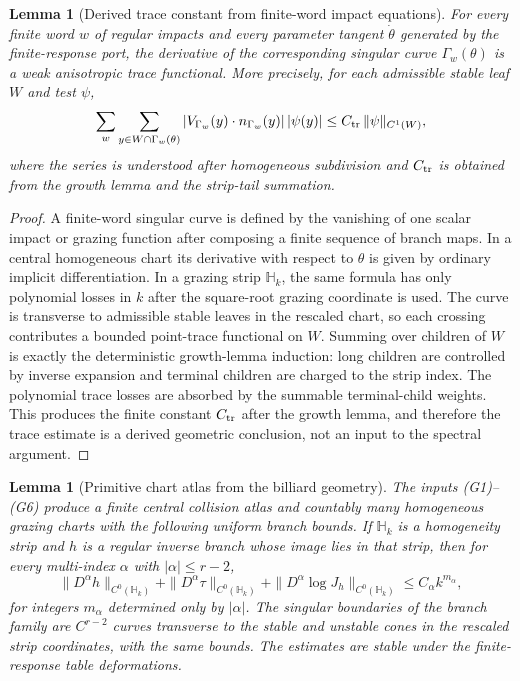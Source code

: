 \documentclass[12pt, letterpaper]{amsart}
\theoremstyle{plain}
\newtheorem{lemma}[theorem]{Lemma}
\theoremstyle{definition}
\theoremstyle{remark}
\begin{document}
\begin{lemma}[Derived trace constant from finite-word impact equations]
\label{lem:finite_word_trace_bound_strengthened}
For every finite word $w$ of regular impacts and every parameter tangent
$\dot\theta$ generated by the finite-response port, the derivative of the
corresponding singular curve $\Gamma_w(\theta)$ is a weak anisotropic trace
functional.  More precisely, for each admissible stable leaf $W$ and test
$\psi$,
\begin{equation}
\label{eq:derived_trace_constant_bound}
    \sum_{w}\sum_{y\in W\cap\Gamma_w(\theta)}
       |V_{\Gamma_w}(y)\cdot n_{\Gamma_w}(y)|\,|\psi(y)|
       \le C_{\rm tr}\,\|\psi\|_{C^1(W)},
\end{equation}
where the series is understood after homogeneous subdivision and
$C_{\rm tr}$ is obtained from the growth lemma and the strip-tail summation.
\end{lemma}

\begin{proof}
A finite-word singular curve is defined by the vanishing of one scalar impact
or grazing function after composing a finite sequence of branch maps.  In a
central homogeneous chart its derivative with respect to $\theta$ is given by
ordinary implicit differentiation.  In a grazing strip $\mathbb H_k$, the same
formula has only polynomial losses in $k$ after the square-root grazing
coordinate is used.  The curve is transverse to admissible stable leaves in the
rescaled chart, so each crossing contributes a bounded point-trace functional on
$W$.  Summing over children of $W$ is exactly the deterministic growth-lemma
induction: long children are controlled by inverse expansion and terminal
children are charged to the strip index.  The polynomial trace losses are
absorbed by the summable terminal-child weights.  This produces the finite
constant $C_{\rm tr}$ after the growth lemma, and therefore the trace estimate
is a derived geometric conclusion, not an input to the spectral argument.
\end{proof}


\begin{lemma}[Primitive chart atlas from the billiard geometry]
\label{lem:primitive_chart_atlas}
The inputs \textup{(G1)--(G6)} produce a finite central collision atlas and
countably many homogeneous grazing charts with the following uniform branch
bounds.  If $\mathbb H_k$ is a homogeneity strip and $h$ is a regular inverse
branch whose image lies in that strip, then for every multi-index $\alpha$ with
$|\alpha|\le r-2$,
\begin{equation}
\label{eq:primitive_branch_derivative_bound}
    \|D^\alpha h\|_{C^0(\mathbb H_k)}
    +\|D^\alpha\tau\|_{C^0(\mathbb H_k)}
    +\|D^\alpha\log J_h\|_{C^0(\mathbb H_k)}
    \le C_\alpha k^{m_\alpha} ,
\end{equation}
for integers $m_\alpha$ determined only by $|\alpha|$.  The singular boundaries
of the branch family are $C^{r-2}$ curves transverse to the stable and unstable
cones in the rescaled strip coordinates, with the same bounds.  The estimates
are stable under the finite-response table deformations.
\end{lemma}
\end{document}
